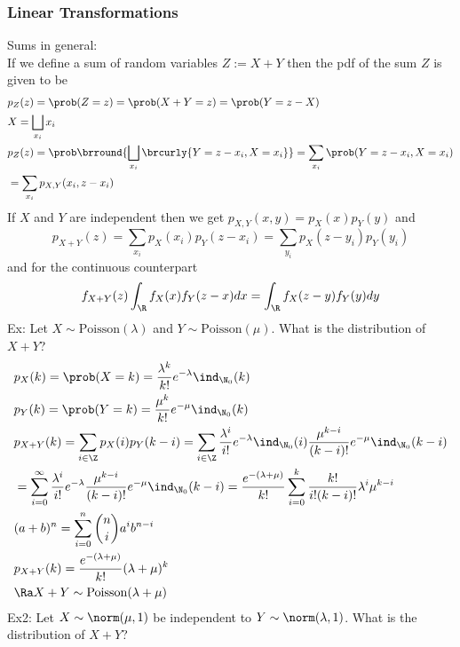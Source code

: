 \subsubsection{Linear Transformations}
Sums in general:\\
If we define a sum of random variables $Z:=X+Y$ then the pdf of the sum $Z$ is given to be
\begin{align*}
    &p_Z(z)=\prob(Z=z)=\prob(X+Y=z)=\prob(Y=z-X)\\
    &X=\bigsqcup_{x_i}x_i\\
    &p_Z(z)=\prob\brround{\bigsqcup_{x_i}\brcurly{Y=z-x_i,X=x_i}}=\sum_{x_i}\prob(Y=z-x_i,X=x_i)\\
    &=\sum_{x_i}p_{X,Y}(x_i,z-x_i)
\end{align*}
If $X$ and $Y$ are independent then we get $p_{X,Y}(x,y)=p_X(x)p_Y(y)$ and
\[p_{X+Y}(z)=\sum_{x_i}p_X(x_i)p_Y(z-x_i)=\sum_{y_i}p_X(z-y_i)p_Y(y_i)\]
and for the continuous counterpart
\[f_{X+Y}(z)\int_\R f_X(x)f_Y(z-x)dx=\int_\R f_X(z-y)f_Y(y)dy\]
Ex: Let $X\sim\mathrm{Poisson}(\lambda)$ and $Y\sim\mathrm{Poisson}(\mu)$. What is the distribution of $X+Y$?
\begin{align*}
    &p_X(k)=\prob(X=k)=\frac{\lambda^k}{k!}e^{-\lambda}\ind_{\N_0}(k)\\
    &p_Y(k)=\prob(Y=k)=\frac{\mu^k}{k!}e^{-\mu}\ind_{\N_0}(k)\\
    &p_{X+Y}(k)=\sum_{i\in\Z} p_X(i)p_Y(k-i)=\sum_{i\in\Z}\frac{\lambda^i}{i!}e^{-\lambda}\ind_{\N_0}(i)\frac{\mu^{k-i}}{(k-i)!}e^{-\mu}\ind_{\N_0}(k-i)\\
    &=\sum_{i=0}^\infty\frac{\lambda^i}{i!}e^{-\lambda}\frac{\mu^{k-i}}{(k-i)!}e^{-\mu}\ind_{\N_0}(k-i)=\frac{e^{-(\lambda+\mu)}}{k!}\sum_{i=0}^k\frac{k!}{i!(k-i)!}\lambda^i\mu^{k-i}\\
    &(a+b)^n=\sum_{i=0}^n\binom{n}{i}a^ib^{n-i}\\
    &p_{X+Y}(k)=\frac{e^{-(\lambda+\mu)}}{k!}(\lambda+\mu)^k\\
    &\Ra X+Y\sim\mathrm{Poisson}(\lambda+\mu)
\end{align*}
Ex2: Let $X\sim\norm(\mu,1)$ be independent to $Y\sim\norm(\lambda,1)$. What is the distribution of $X+Y$?
